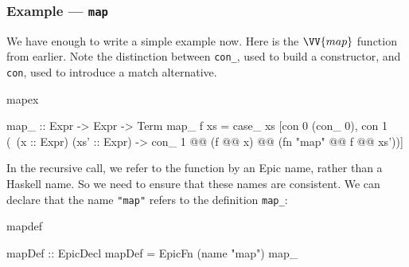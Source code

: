 \subsubsection*{Example --- \texttt{map}}

We have enough to write a simple example now. Here is the $\VV{map}$
function from earlier. Note the distinction between \texttt{con\_},
used to build a constructor, and \texttt{con}, used to introduce a
match alternative.

\begin{SaveVerbatim}{mapex}

map_ :: Expr -> Expr -> Term
map_ f xs = case_ xs 
   [con 0 (con_ 0),
    con 1 (\ (x :: Expr) (xs' :: Expr)
      -> con_ 1 @@ (f @@ x) @@ (fn "map" @@ f @@ xs'))]

\end{SaveVerbatim}

In the recursive call, we refer to the function by an Epic name,
rather than a Haskell name. So we need to ensure that these names are
consistent. We can declare that the name \texttt{"map"} refers to the
definition \texttt{map\_}:

\begin{SaveVerbatim}{mapdef}

mapDef :: EpicDecl
mapDef = EpicFn (name "map") map_

\end{SaveVerbatim}
